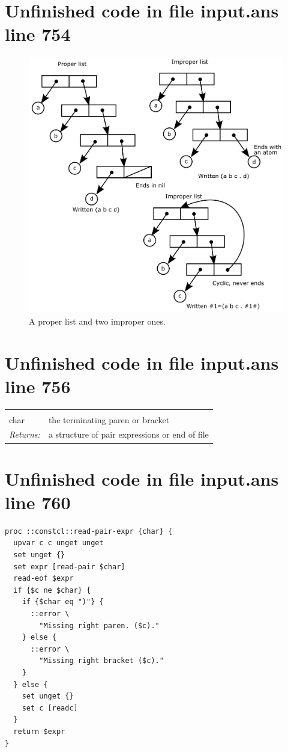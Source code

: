\documentclass[twoside,9pt]{report}
\begin{document}
\section{Unfinished code in file input.ans line 754}
\begin{figure}[h!]\includegraphics{images/prop-improp.png}\captionsetup{labelformat=empty}\caption{ A proper list and two improper ones.}\label{fig:-a-proper-list-and-two-improper-ones}\end{figure}
\section{Unfinished code in file input.ans line 756}
\noindent\begin{tabular}{ |p{1.9cm} p{8cm}| }
\hline
\rowcolor[HTML]{CCCCCC} \multicolumn{2}{|l|}{\bf read-pair-expr (internal)} \\
char & the terminating paren or bracket \\
\textit{Returns:} & a structure of pair expressions or end of file \\
\hline
\end{tabular}
\section{Unfinished code in file input.ans line 760}
\begin{lstlisting}
proc ::constcl::read-pair-expr {char} {
  upvar c c unget unget
  set unget {}
  set expr [read-pair $char]
  read-eof $expr
  if {$c ne $char} {
    if {$char eq ")"} {
      ::error \
        "Missing right paren. ($c)."
    } else {
      ::error \
        "Missing right bracket ($c)."
    }
  } else {
    set unget {}
    set c [readc]
  }
  return $expr
}
\end{lstlisting}
\end{document}
